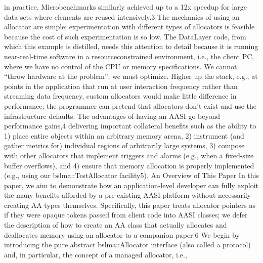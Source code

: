 in practice. Microbenchmarks similarly achieved up to a 12x speedup for large
data sets where elements are reused intensively.3 The mechanics of using an
allocator are simple; experimentation with different types of allocators is
feasible because the cost of such experimentation is so low.
The DataLayer code, from which this example is distilled, needs this attention
to detail because it is running near-real-time software in a resourceconstrained environment, i.e., the client PC, where we have no control of the
CPU or memory specifications. We cannot “throw hardware at the problem”; we
must optimize. Higher up the stack, e.g., at points in the application that run
at user interaction frequency rather than streaming data frequency, custom
allocators would make little difference in performance; the programmer can
pretend that allocators don’t exist and use the infrastructure defaults.
The advantages of having an AASI go beyond performance gains,4 delivering
important collateral benefits such as the ability to
1) place entire objects within an arbitrary memory arena,
2) instrument (and gather metrics for) individual regions of arbitrarily large
systems,
3) compose with other allocators that implement triggers and alarms (e.g.,
when a fixed-size buffer overflows), and
4) ensure that memory allocation is properly implemented (e.g., using our
bslma::TestAllocator facility5).
An Overview of This Paper
In this paper, we aim to demonstrate how an application-level developer can
fully exploit the many benefits afforded by a pre-existing AASI platform without
necessarily creating AA types themselves. Specifically, this paper treats
allocator pointers as if they were opaque tokens passed from client code into
AASI classes; we defer the description of how to create an AA class that
actually allocates and deallocates memory using an allocator to a companion
paper.6
We begin by introducing the pure abstract bslma::Allocator interface (also
called a protocol) and, in particular, the concept of a managed allocator, i.e.,

